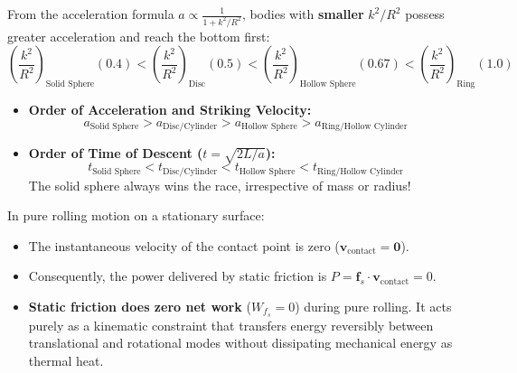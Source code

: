 \documentclass[10pt,a4paper]{article}
\begin{document}
\begin{usecasebox}
From the acceleration formula $a \propto \frac{1}{1 + k^2/R^2}$, bodies with \textbf{smaller} $k^2/R^2$ possess greater acceleration and reach the bottom first:
\begin{equation}
  \left(\frac{k^2}{R^2}\right)_{\text{Solid Sphere}} (0.4) < \left(\frac{k^2}{R^2}\right)_{\text{Disc}} (0.5) < \left(\frac{k^2}{R^2}\right)_{\text{Hollow Sphere}} (0.67) < \left(\frac{k^2}{R^2}\right)_{\text{Ring}} (1.0)
\end{equation}
\begin{itemize}
  \item \textbf{Order of Acceleration and Striking Velocity:}
  \begin{equation}
    a_{\text{Solid Sphere}} > a_{\text{Disc/Cylinder}} > a_{\text{Hollow Sphere}} > a_{\text{Ring/Hollow Cylinder}}
  \end{equation}
  \item \textbf{Order of Time of Descent ($t = \sqrt{2L/a}$):}
  \begin{equation}
    t_{\text{Solid Sphere}} < t_{\text{Disc/Cylinder}} < t_{\text{Hollow Sphere}} < t_{\text{Ring/Hollow Cylinder}}
  \end{equation}
  The solid sphere always wins the race, irrespective of mass or radius!
\end{itemize}
\end{usecasebox}

\begin{trapbox}
In pure rolling motion on a stationary surface:
\begin{itemize}
  \item The instantaneous velocity of the contact point is zero ($\mathbf{v}_{\text{contact}} = \mathbf{0}$).
  \item Consequently, the power delivered by static friction is $P = \mathbf{f}_s \cdot \mathbf{v}_{\text{contact}} = 0$.
  \item \textbf{Static friction does zero net work} ($W_{f_s} = 0$) during pure rolling. It acts purely as a kinematic constraint that transfers energy reversibly between translational and rotational modes without dissipating mechanical energy as thermal heat.
\end{itemize}
\end{trapbox}

\end{document}
